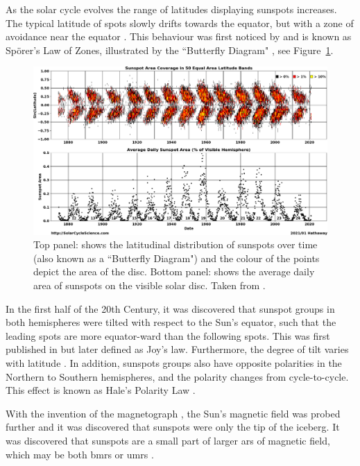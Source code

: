 As the solar cycle evolves the range of latitudes displaying sunspots increases. The typical latitude of spots slowly drifts towards the equator, but with a zone of avoidance near the equator \citep{hathaway_solar_2015}. This behaviour was first noticed by \citet{carrington_observations_1863} and is known as Sp\"{o}rer’s Law of Zones, illustrated by the ``Butterfly Diagram" \citep{maunder_spoerers_1903, maunder_note_1904}, see Figure~\ref{fig:butterfly}.

\begin{figure}[ht!]
	\centering
	\includegraphics[width=\columnwidth]{ButterflyDiagram.png}
	\caption{Top panel: shows the latitudinal distribution of sunspots over time (also known as a ``Butterfly Diagram") and the colour of the points depict the area of the disc. Bottom panel: shows the average daily area of sunspots on the visible solar disc. Taken from \citet{hathaway_solar_2017}.}
	\label{fig:butterfly}
\end{figure}

In the first half of the 20th Century, it was discovered that sunspot groups in both hemispheres were tilted with respect to the Sun's equator, such that the leading spots are more equator-ward than the following spots. This was first published in \citet{hale_magnetic_1919} but later defined as Joy's law. Furthermore, the degree of tilt varies with latitude \citep{hathaway_solar_2015}. In addition, sunspots groups also have opposite polarities in the Northern to Southern hemispheres, and the polarity changes from cycle-to-cycle. This effect is known as Hale’s Polarity Law \citep{hale_law_1925}.

With the invention of the magnetograph \citep{babcock_solar_1953}, the Sun's magnetic field was probed further and it was discovered that sunspots were only the tip of the iceberg. It was discovered that sunspots are a small part of larger \glspl{ar} of magnetic field, which may be both \glspl{bmr} or \glspl{umr} \citep{babcock_suns_1955}.

